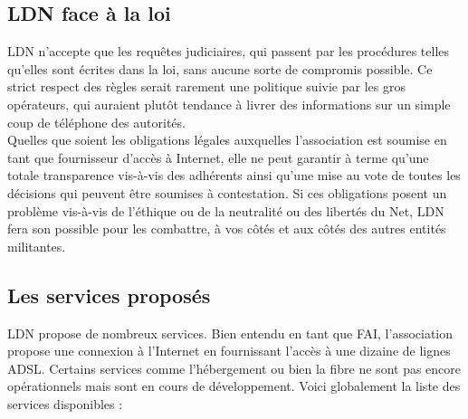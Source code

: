 	\subsection{LDN face à la loi}
		\vspace{0.3cm}

		LDN n'accepte que les requêtes judiciaires, qui passent par les procédures telles qu'elles sont écrites dans la loi, sans aucune sorte de compromis possible. Ce strict respect des règles serait rarement une politique suivie par les gros opérateurs, qui auraient plutôt tendance à livrer des informations sur un simple coup de téléphone des autorités. \\
		
		Quelles que soient les obligations légales auxquelles l'association est soumise en tant que fournisseur d’accès à Internet, elle ne peut garantir à terme qu’une totale transparence vis-à-vis des adhérents ainsi qu’une mise au vote de toutes les décisions qui peuvent être soumises à contestation. Si ces obligations posent un problème vis-à-vis de l’éthique ou de la neutralité ou des libertés du Net, LDN fera son possible pour les combattre, à vos côtés et aux côtés des autres entités militantes.\\

	\subsection{Les services proposés}
		\vspace{0.3cm}
		LDN propose de nombreux services. Bien entendu en tant que FAI, l'association propose une connexion à l'Internet en fournissant l'accès à une dizaine de lignes ADSL. Certains services comme l'hébergement ou bien la fibre ne sont pas encore opérationnels mais sont en cours de développement. Voici globalement la liste des services disponibles : \\

